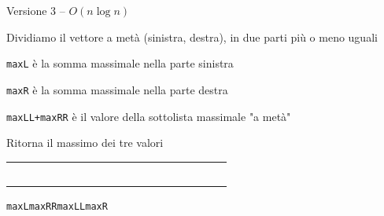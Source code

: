 \begin{frame}[fragile]{Versione 3 -- $O(n \log n)$}

\vspace{-6pt}
\begin{myboxtitle}
\BIL
\item Dividiamo il vettore a metà (sinistra, destra), in due parti più o meno uguali
\item \texttt{maxL} è la somma massimale nella parte sinistra
\item \texttt{maxR} è la somma massimale nella parte destra
\item \texttt{maxLL+maxRR} è il valore della sottolista massimale "a metà"
\item Ritorna il massimo dei tre valori
\EIL
\end{myboxtitle}

\begin{center}
\begingroup
\LARGE
\begin{tabular}{!{\vrule width 1.5pt}p{0.30cm}|p{0.30cm}|p{0.30cm}|p{0.30cm}|p{0.30cm}|p{0.30cm}|p{0.30cm}|p{0.30cm}!{\vrule width 1.5pt}p{0.30cm}|p{0.30cm}|p{0.30cm}|p{0.30cm}|p{0.30cm}|p{0.30cm}|p{0.30cm}|p{0.30cm}!{\vrule width 1.5pt}}
~~&&&&&~~&&&&&&~~&~~&&&\\
\end{tabular}
\endgroup
\end{center}
\Large
\hspace*{1.7cm}\texttt{maxL}\hspace*{1.9cm}\texttt{maxRR\quad maxLL}\hspace*{2.8cm}\texttt{maxR}

\end{frame}

